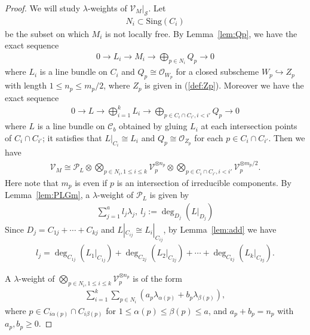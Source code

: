 \documentclass[11pt,oneside,a4paper,mathscr]{amsart}
\theoremstyle{definition}
\renewcommand{\leq}{\leqslant}
\renewcommand{\geq}{\geqslant}
\newcommand{\cS}{\mathcal{S}}
\newcommand{\cC}{\mathcal{C}}
\begin{document}
\begin{proof}
We will study $\lambda$-weights of $\mathcal{V}_M|_{\cS}$. 
Let 
\begin{align*}
    N_i \subset \mathrm{Sing}(C_i)
\end{align*}
be the subset on which $M_i$ is not locally free. 
By Lemma~\ref{lem:Qp}, we have the exact sequence 
\begin{align}\label{ex:LM1}
    0\to L_i \to M_i \to \bigoplus_{p\in N_i}Q_p \to 0
\end{align}
where $L_i$ is a line bundle on $C_i$ and $Q_p \cong \mathcal{O}_{W_p}$ for 
a closed subscheme $W_p \hookrightarrow Z_p$ with length $1\leq n_p \leq m_p/2$, where $Z_p$ is given in (\ref{def:Zp}). Moreover we have the exact sequence 
\begin{align}\label{ex:LM2}
    0\to L \to \bigoplus_{i=1}^k L_i \to \bigoplus_{p\in C_i \cap C_{i'}, i<i'}Q_p \to 0
\end{align}
where $L$ is a line bundle on $\cC_b$ obtained by gluing $L_i$ at each intersection 
points of $C_i \cap C_{i'}$; it satisfies that 
$L|_{C_i}\cong L_i$ and $Q_p \cong \mathcal{O}_{Z_p}$ 
for each $p\in C_i \cap C_{i'}$. 
Then we have 
\begin{align*}
    \mathcal{V}_M \cong \mathcal{P}_L \otimes \bigotimes_{p\in N_i, 1\leq i\leq k}\mathcal{V}_p^{\otimes n_p} \otimes 
    \bigotimes_{p\in C_i \cap C_{i'}, i<i'}\mathcal{V}_p^{\otimes m_p/2}.
\end{align*}
Here note that $m_p$ is even if $p$ is an intersection of irreducible components. By Lemma~\ref{lem:PLGm}, 
a $\lambda$-weight of 
$\mathcal{P}_L$ is given by 
\begin{align}\label{wt:3}
\sum_{j=1}^a l_j \lambda_j, \ l_j:=\deg_{D_j}(L|_{D_j})
\end{align}
Since $D_j=C_{1j}+\cdots+C_{kj}$ and $L|_{C_{ij}}\cong L_i|_{C_{ij}}$, 
by Lemma~\ref{lem:add} we have 
\begin{align}\label{lj}
l_j=\deg_{C_{1j}}(L_1|_{C_{1j}})+\deg_{C_{2j}}(L_2|_{C_{2j}})+\cdots+ \deg_{C_{kj}}(L_k|_{C_{kj}}).
\end{align}

A $\lambda$-weight of $\bigotimes_{p\in N_i, 1\leq i\leq k}\mathcal{V}_p^{\otimes n_p}$
is of the form 
\begin{align}\label{wt:4}
    \sum_{i=1}^k \sum_{p\in N_i} (a_p\lambda_{\alpha(p)}+b_p\lambda_{\beta(p)}), 
\end{align}
where $p \in C_{i\alpha(p)}\cap C_{i\beta(p)}$ for $1\leq \alpha(p) \leq \beta(p) \leq a$, 
and $a_p+b_p=n_p$ with $a_p, b_p\geq 0$. 


\end{proof}
\end{document}
